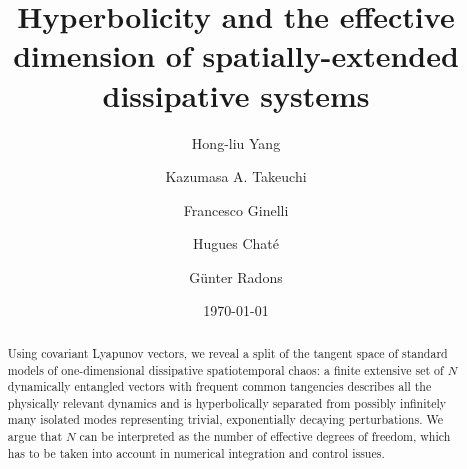 \documentclass[prl,twocolumn,twoside,showpacs,superscriptaddress]{revtex4}
\begin{document}
\title{Hyperbolicity and the effective dimension of spatially-extended
dissipative systems}

\author{Hong-liu Yang}
\author{Kazumasa A. Takeuchi}
%
%
\author{Francesco Ginelli}
%
%
\author{Hugues Chat\'e}
%
\author{G\"unter Radons}%

\date{\today}

\begin{abstract}
Using covariant Lyapunov vectors, we reveal a split of the tangent space
of standard models of one-dimensional dissipative spatiotemporal chaos:
a finite extensive set of $N$ dynamically entangled 
vectors with frequent common tangencies describes all the physically relevant dynamics and is
hyperbolically separated from possibly infinitely many isolated modes
representing trivial, exponentially decaying perturbations. We argue
that $N$ can be interpreted as the number of effective degrees of
freedom, which has to be taken into account in numerical integration and
control issues.
\end{abstract}


\maketitle
\end{document}
